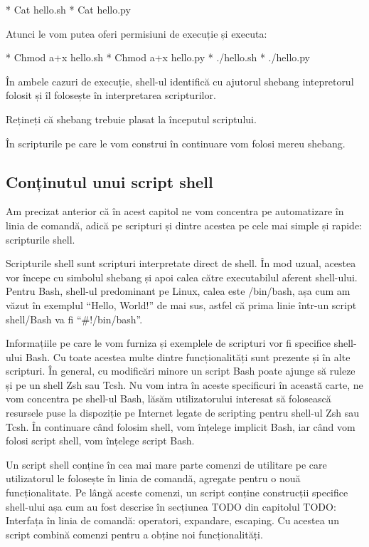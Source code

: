 * Cat hello.sh
* Cat hello.py

Atunci le vom putea oferi permisiuni de execuție și executa:

* Chmod a+x hello.sh
* Chmod a+x hello.py
* ./hello.sh
* ./hello.py

În ambele cazuri de execuție, shell-ul identifică cu ajutorul shebang
intepretorul folosit și îl folosește în interpretarea scripturilor.

Rețineți că shebang trebuie plasat la începutul scriptului.

În scripturile pe care le vom construi în continuare vom folosi mereu shebang.

\subsection{Conținutul unui script shell}
\label{sec:script-dev-content}

Am precizat anterior că în acest capitol ne vom concentra pe automatizare în
linia de comandă, adică pe scripturi și dintre acestea pe cele mai simple și
rapide: scripturile shell.

Scripturile shell sunt scripturi interpretate direct de shell. În mod uzual,
acestea vor începe cu simbolul shebang și apoi calea către executabilul aferent
shell-ului. Pentru Bash, shell-ul predominant pe Linux, calea este /bin/bash,
așa cum am văzut în exemplul “Hello, World!” de mai sus, astfel că prima linie
într-un script shell/Bash va fi “\#!/bin/bash”.

Informațiile pe care le vom furniza și exemplele de scripturi vor fi specifice
shell-ului Bash. Cu toate acestea multe dintre funcționalități sunt prezente și
în alte scripturi. În general, cu modificări minore un script Bash poate ajunge
să ruleze și pe un shell Zsh sau Tcsh. Nu vom intra în aceste specificuri în
această carte, ne vom concentra pe shell-ul Bash, lăsăm utilizatorului interesat
să folosească resursele puse la dispoziție pe Internet legate de scripting
pentru shell-ul Zsh sau Tcsh. În continuare când folosim shell, vom înțelege
implicit Bash, iar când vom folosi script shell, vom înțelege script Bash.

Un script shell conține în cea mai mare parte comenzi de utilitare pe care
utilizatorul le folosește în linia de comandă, agregate pentru o nouă
funcționalitate. Pe lângă aceste comenzi, un script conține construcții
specifice shell-ului așa cum au fost descrise în secțiunea TODO din capitolul
TODO: Interfața în linia de comandă: operatori, expandare, escaping. Cu acestea
un script combină comenzi pentru a obține noi funcționalități.


